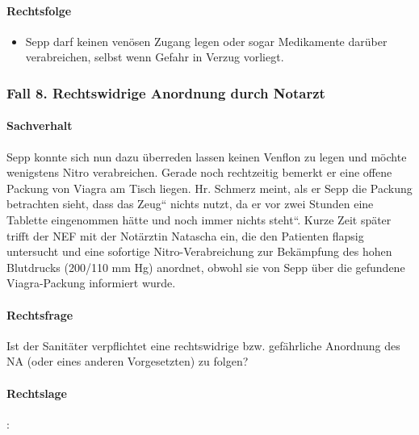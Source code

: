 \paragraph*{Rechtsfolge}

\begin{itemize}
\item {\mdseries\color[rgb]{0.0,0.0,0.5019608}
Sepp darf keinen ven\"osen Zugang legen oder sogar Medikamente dar\"uber
verabreichen, selbst  wenn Gefahr in Verzug vorliegt. }

\end{itemize}

\subsubsection{Fall 8. Rechtswidrige Anordnung durch Notarzt}

\paragraph*{Sachverhalt}

Sepp konnte sich nun dazu \"uberreden lassen keinen Venflon zu legen und
m\"ochte wenigstens Nitro verabreichen. Gerade noch rechtzeitig bemerkt
er eine offene Packung von Viagra am Tisch liegen. Hr. Schmerz meint,
als er Sepp die Packung betrachten sieht, dass das
{\quotedblbase}Zeug{\textquotedblleft} nichts nutzt, da er vor zwei
Stunden eine Tablette eingenommen hätte und noch immer
{\quotedblbase}nichts steht{\textquotedblleft}. Kurze Zeit später
trifft der NEF mit der Notärztin Natascha ein, die den
Patienten flapsig untersucht und eine sofortige
Nitro-Verabreichung zur Bekämpfung des hohen Blutdrucks (200/110 mm Hg) anordnet, obwohl sie von Sepp \"uber
die gefundene Viagra-Packung informiert wurde.

\paragraph*{Rechtsfrage}

Ist der Sanitäter verpflichtet eine rechtswidrige bzw. gefährliche
Anordnung des NA (oder eines anderen Vorgesetzten) zu folgen?

\paragraph*{Rechtslage}

:

